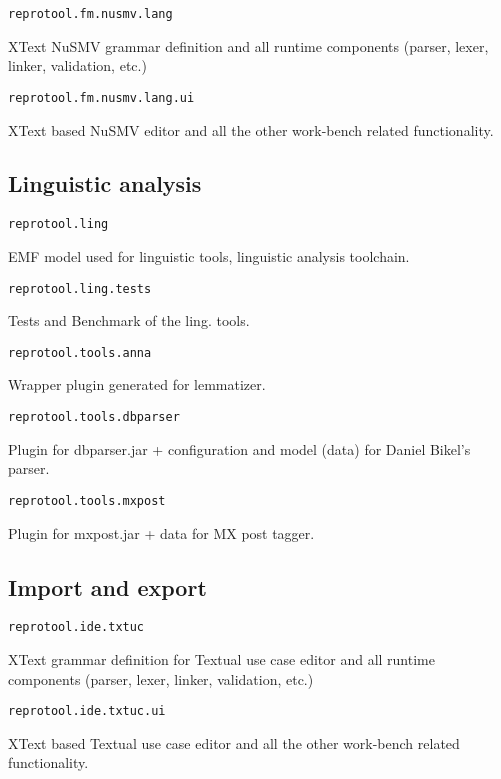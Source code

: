 \begin{verbatim}
reprotool.fm.nusmv.lang
\end{verbatim}
XText NuSMV grammar definition and all runtime components (parser, lexer, linker, validation, etc.)

\begin{verbatim}
reprotool.fm.nusmv.lang.ui
\end{verbatim}
XText based NuSMV editor and all the other work-bench related functionality.

\subsection{Linguistic analysis}

\begin{verbatim}
reprotool.ling
\end{verbatim}
EMF model used for linguistic tools, linguistic analysis toolchain.

\begin{verbatim}
reprotool.ling.tests
\end{verbatim}
Tests and Benchmark of the ling. tools.

\begin{verbatim}
reprotool.tools.anna
\end{verbatim}
Wrapper plugin generated for lemmatizer.

\begin{verbatim}
reprotool.tools.dbparser
\end{verbatim}
Plugin for dbparser.jar + configuration and model (data) for Daniel Bikel's parser.

\begin{verbatim}
reprotool.tools.mxpost
\end{verbatim}
Plugin for mxpost.jar + data for MX post tagger.


\subsection{Import and export}

\begin{verbatim}
reprotool.ide.txtuc
\end{verbatim}
XText grammar definition for Textual use case editor and all runtime components (parser, lexer, linker, validation, etc.)

\begin{verbatim}
reprotool.ide.txtuc.ui
\end{verbatim}
XText based Textual use case editor and all the other work-bench related functionality.

